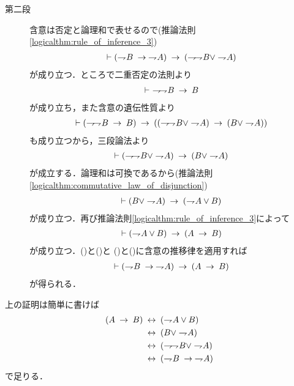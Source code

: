 \begin{prf}
\begin{description}
			\item[第二段]
				含意は否定と論理和で表せるので(推論法則\ref{logicalthm:rule_of_inference_3})
				\begin{align}
					\vdash (\negation B \rarrow \negation A)
					\rarrow (\negation \negation B \vee \negation A)
					\label{eq:thm_contraposition_is_true_5}
				\end{align}
				が成り立つ．ところで二重否定の法則より
				\begin{align}
					\vdash\ \negation \negation B \rarrow B
				\end{align}
				が成り立ち，また含意の遺伝性質より
				\begin{align}
					\vdash (\negation \negation B \rarrow B)
					\rarrow ((\negation \negation B \vee \negation A)
					\rarrow (B \vee \negation A))
				\end{align}
				も成り立つから，三段論法より
				\begin{align}
					\vdash (\negation \negation B \vee \negation A)
					\rarrow (B \vee \negation A)
					\label{eq:thm_contraposition_is_true_6}
				\end{align}
				が成立する．論理和は可換であるから(推論法則\ref{logicalthm:commutative_law_of_disjunction})
				\begin{align}
					\vdash (B \vee \negation A) \rarrow (\negation A \vee B)
					\label{eq:thm_contraposition_is_true_7}
				\end{align}
				が成り立つ．再び推論法則\ref{logicalthm:rule_of_inference_3}によって
				\begin{align}
					\vdash (\negation A \vee B)
					\rarrow (A \rarrow B)
					\label{eq:thm_contraposition_is_true_8}
				\end{align}
				が成り立つ．()と()と
				()と()に含意の推移律を適用すれば
				\begin{align}
					\vdash (\negation B \rarrow \negation A) \rarrow (A \rarrow B)
				\end{align}
				が得られる．
				\QED
		\end{description}
	\end{prf}
	
	上の証明は簡単に書けば
	\begin{align}
		(A \rarrow B) &\lrarrow (\negation A \vee B) \\
		&\lrarrow (B \vee \negation A) \\
		&\lrarrow (\negation \negation B \vee \negation A) \\
		&\lrarrow (\negation B \rarrow \negation A)
	\end{align}
	で足りる．
	
